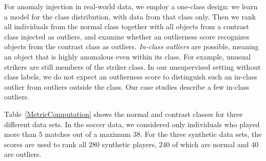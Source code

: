 {For anomaly injection in real-world data, we employ a one-class design: we learn a model for the class distribution, with data from that class only. 
Then we rank all individuals from the normal class together with all objects from a contrast class injected as outliers, and examine whether an outlierness score recognizes objects from the contrast class as outliers. {\em In-class outliers} are possible, meaning an object that is highly anomalous even within its class. For example, unusual strikers are still members of the striker class. In our unsupervised setting without class labels, we do not expect an outlierness score to distinguish such an in-class outlier from outliers outside the class. Our case studies describe a few in-class outliers.
				
Table~\ref{MetricComputation} shows the normal and contrast classes for three different data sets.   In the soccer data, we considered only individuals who played more than 5 matches out of a maximum 38. For the three synthetic data sets, the scores are used to rank all 280 synthetic  players, 240 of which are normal and 40 are outliers.
				
			
				

				
}
